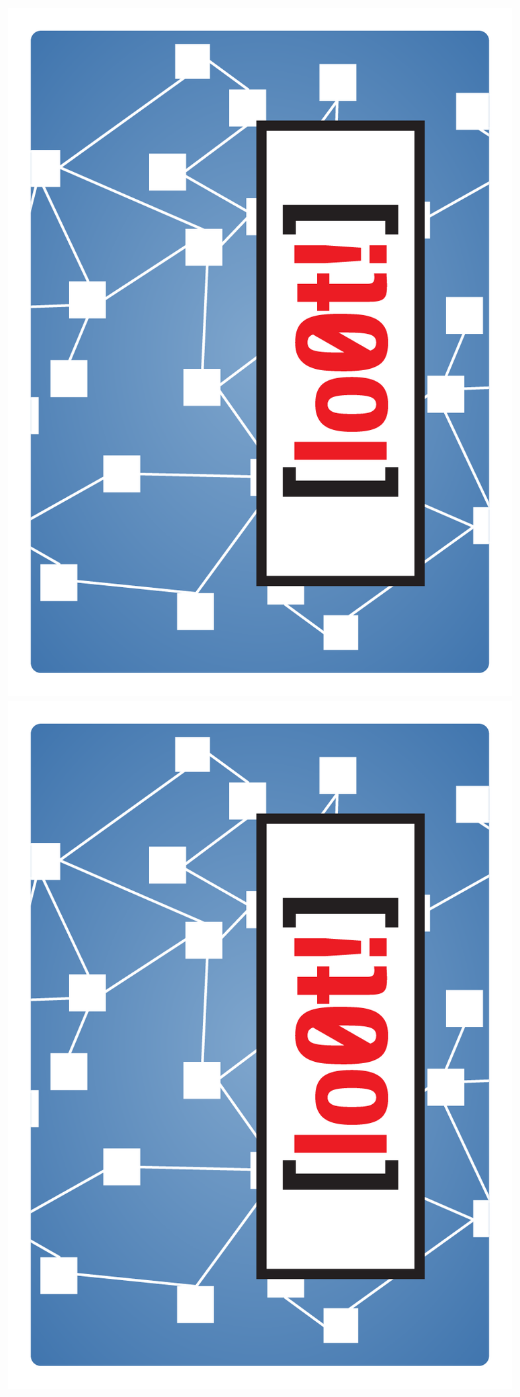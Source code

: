 \documentclass{letter}
\begin{document}
\includegraphics{backs/back_lo0t}
\includegraphics{backs/back_lo0t}
\end{document}
